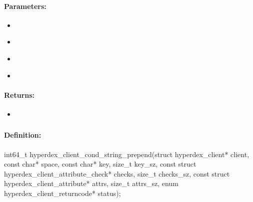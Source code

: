 \paragraph{Parameters:}
\begin{itemize}[noitemsep]
\item {}\\

\item {}\\

\item {}\\

\item {}\\

\end{itemize}

\paragraph{Returns:}
\begin{itemize}[noitemsep]
\item {}\\

\end{itemize}

\pagebreak
\subsubsection{}
\label{api:c:cond_string_prepend}


\paragraph{Definition:}
\begin{ccode}
int64_t hyperdex_client_cond_string_prepend(struct hyperdex_client* client,
        const char* space,
        const char* key, size_t key_sz,
        const struct hyperdex_client_attribute_check* checks, size_t checks_sz,
        const struct hyperdex_client_attribute* attrs, size_t attrs_sz,
        enum hyperdex_client_returncode* status);
\end{ccode}

